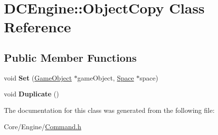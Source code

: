 \hypertarget{classDCEngine_1_1ObjectCopy}{\section{D\-C\-Engine\-:\-:Object\-Copy Class Reference}
\label{classDCEngine_1_1ObjectCopy}
}
\subsection*{Public Member Functions}
\begin{DoxyCompactItemize}
\item 
\hypertarget{classDCEngine_1_1ObjectCopy_a6e9c76001f720a08895d95de15dfaa19}{void {\bfseries Set} (\hyperlink{classDCEngine_1_1GameObject}{Game\-Object} $\ast$game\-Object, \hyperlink{classDCEngine_1_1Space}{Space} $\ast$space)}\label{classDCEngine_1_1ObjectCopy_a6e9c76001f720a08895d95de15dfaa19}

\item 
\hypertarget{classDCEngine_1_1ObjectCopy_a692a9e14135529fa3b3b9a5c94411696}{void {\bfseries Duplicate} ()}\label{classDCEngine_1_1ObjectCopy_a692a9e14135529fa3b3b9a5c94411696}

\end{DoxyCompactItemize}


The documentation for this class was generated from the following file\-:\begin{DoxyCompactItemize}
\item 
Core/\-Engine/\hyperlink{Command_8h}{Command.\-h}\end{DoxyCompactItemize}
